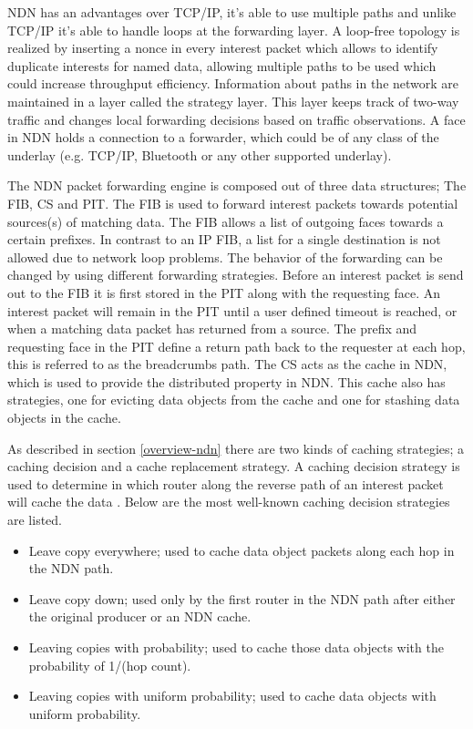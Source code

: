 NDN has an advantages over TCP/IP, it's able to use multiple paths and unlike TCP/IP it's able to handle loops at the forwarding layer. A loop-free topology is realized by inserting a nonce in every interest packet which allows to identify duplicate interests for named data, allowing multiple paths to be used which could increase throughput efficiency. Information about paths in the network are maintained in a layer called the strategy layer. This layer keeps track of two-way traffic and changes local forwarding decisions based on traffic observations. A face in NDN holds a connection to a forwarder, which could be of any class of the underlay (e.g. TCP/IP, Bluetooth or any other supported underlay).

The NDN packet forwarding engine is composed out of three data structures; The FIB, CS and PIT. The FIB is used to forward interest packets towards potential sources(s) of matching data. The FIB allows a list of outgoing faces towards a certain prefixes. In contrast to an IP FIB, a list for a single destination is not allowed due to network loop problems. The behavior of the forwarding can be changed by using different forwarding strategies. Before an interest packet is send out to the FIB it is first stored in the PIT along with the requesting face. An interest packet will remain in the PIT until a user defined timeout is reached, or when a matching data packet has returned from a source. The prefix and requesting face in the PIT define a return path back to the requester at each hop, this is referred to as the breadcrumbs path. The CS acts as the cache in NDN, which is used to provide the distributed property in NDN. This cache also has strategies, one for evicting data objects from the cache and one for stashing data objects in the cache.

As described in section \ref{overview-ndn} there are two kinds of caching strategies; a caching decision and a cache replacement strategy. A caching decision strategy is used to determine in which router along the reverse path of an interest packet will cache the data \cite{koulouzis2018information}. Below are the most well-known caching decision strategies are listed.

\begin{itemize}
    \item Leave copy everywhere; used to cache data object packets along each hop in the NDN path.
    \item Leave copy down; used only by the first router in the NDN path after either the original producer or an NDN cache.
    \item Leaving copies with probability; used to cache those data objects with the probability of 1/(hop count).
    \item Leaving copies with uniform probability; used to cache data objects with uniform probability.
\end{itemize}

